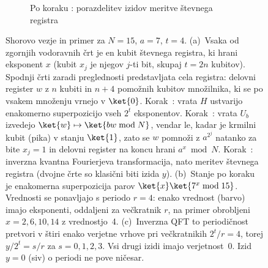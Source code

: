 \begin{figure}[htbp]
\medskip
\begin{subfigure}{\textwidth}
\centering
{}
\caption{Po koraku : porazdelitev izidov meritve števnega registra}
\label{g29:fig:vezje-c}
\end{subfigure}
\caption[Shorovo vezje in primer za $N = 15$]{Shorovo vezje in primer za $N = 15$, $a = 7$, $t = 4$.
(a)~Vsaka od zgornjih vodoravnih črt je en kubit števnega registra, ki hrani eksponent $x$ (kubit $x_j$ je njegov $j$-ti bit, skupaj $t = 2n$ kubitov). Spodnji črti zaradi preglednosti predstavljata cela registra: delovni register $w$ z $n$ kubiti in $n+4$ pomožnih kubitov množilnika, ki se po vsakem množenju vrnejo v $\ket{0}$. Korak~: vrata $H$ ustvarijo enakomerno superpozicijo vseh $2^t$ eksponentov. Korak~: vrata $U_b$ izvedejo $\ket{w} \mapsto \ket{bw \bmod N}$, vendar le, kadar je krmilni kubit (pika) v stanju $\ket{1}$, zato se $w$ pomnoži z $a^{2^j}$ natanko za bite $x_j = 1$ in delovni register na koncu hrani $a^x \bmod N$. Korak~: inverzna kvantna Fourierjeva transformacija, nato meritev števnega registra (dvojne črte so klasični biti izida $y$).
(b)~Stanje po koraku~ je enakomerna superpozicija parov $\ket{x}\ket{7^x \bmod 15}$. Vrednosti se ponavljajo s periodo $r = 4$: enako vrednost (barvo) imajo eksponenti, oddaljeni za večkratnik $r$, na primer obrobljeni $x = 2, 6, 10, 14$ z vrednostjo~4.
(c)~Inverzna QFT to periodičnost pretvori v štiri enako verjetne vrhove pri večkratnikih $2^t/r = 4$, torej $y/2^t = s/r$ za $s = 0, 1, 2, 3$. Vsi drugi izidi imajo verjetnost~0. Izid $y = 0$ (siv) o periodi ne pove ničesar.}
\label{g29:fig:vezje}
\end{figure}

